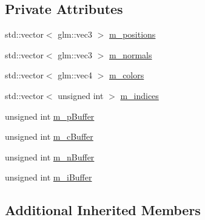 \subsection*{Private Attributes}
\begin{DoxyCompactItemize}
\item 
std\+::vector$<$ glm\+::vec3 $>$ \hyperlink{classHierarchicalMeshRenderable_a71289ce6648a162703a37814cb518459}{m\+\_\+positions}
\item 
std\+::vector$<$ glm\+::vec3 $>$ \hyperlink{classHierarchicalMeshRenderable_a0434afe3af71c5afcd7a3bc8318a0e98}{m\+\_\+normals}
\item 
std\+::vector$<$ glm\+::vec4 $>$ \hyperlink{classHierarchicalMeshRenderable_abcca72b5ae0157f6e9b23f3647939091}{m\+\_\+colors}
\item 
std\+::vector$<$ unsigned int $>$ \hyperlink{classHierarchicalMeshRenderable_a07550075b3137838436b798d2a772092}{m\+\_\+indices}
\item 
unsigned int \hyperlink{classHierarchicalMeshRenderable_abe9a8d6e06601db7f9e7ab8a5e306b78}{m\+\_\+p\+Buffer}
\item 
unsigned int \hyperlink{classHierarchicalMeshRenderable_a25985832ff7ad2ec41d818ba48190722}{m\+\_\+c\+Buffer}
\item 
unsigned int \hyperlink{classHierarchicalMeshRenderable_ae781c5aa305cc72608e3bd1b56129410}{m\+\_\+n\+Buffer}
\item 
unsigned int \hyperlink{classHierarchicalMeshRenderable_aaecf88387b5e1d8fe5c0d16bf5a7f6ab}{m\+\_\+i\+Buffer}
\end{DoxyCompactItemize}
\subsection*{Additional Inherited Members}


